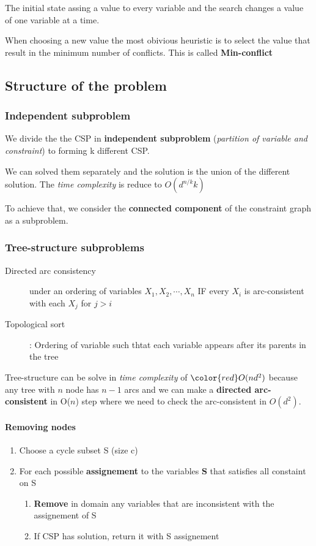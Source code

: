 The  initial state  assing  a value  to every  variable  and the  search
changes a value of one variable at a time.

When choosing a  new value the most obivious heuristic  is to select the
value that  result in the  minimum number  of conflicts. This  is called
\textbf{Min-conflict}

\subsection{Structure of the problem}

\subsubsection{Independent subproblem}

We   divide    the   the   CSP   in    \textbf{independent   subproblem}
(\textit{partition of  variable and constraint}) to  forming k different
CSP.

We can solved them separately and the solution is the union of the different
solution. The \textit{time complexity} is reduce to $O(d^{n/k} k)$

To achieve that, we consider  the \textbf{connected component} of
the constraint graph as a subproblem.

\subsubsection{Tree-structure subproblems}

\begin{description}
    \item[Directed arc consistency] under an ordering of variables $X_1, X_2, \cdots, X_n$
        IF every $X_i$ is arc-consistent with each $X_j$ for $j > i$
    \item[Topological sort] : Ordering of variable such thtat each variable 
        appears after its parents in the tree
\end{description}

Tree-structure  can be  solve in  \textit{time complexity}  of $\color{red} O(nd^2)$
because  any tree  with  $n$ node  has  $n-1$  arcs and  we  can make  a
\textbf{directed arc-consistent} in  O($n$) step where we  need to check
the arc-consistent in $O(d^2)$.


\paragraph{Removing nodes}
\begin{enumerate}
    \item Choose a cycle subset S (size c)
    \item For each possible \textbf{assignement} to the variables \textbf{S} that satisfies all constaint on S
        \begin{enumerate}
            \item \textbf{Remove} in domain any variables that are inconsistent with the assignement of S
            \item If CSP has solution, return it with S assignement
        \end{enumerate}
\end{enumerate}

